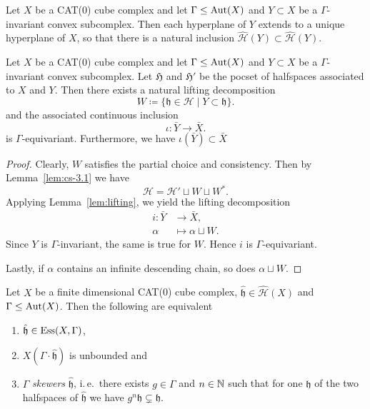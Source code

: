 \begin{lemma}
  \label{lem:cs-3.1}
  Let \(X\) be a CAT(0) cube complex and let \(\Gamma \leq \operatorname{Aut}(X)\) and \(Y \subset X\) be a \(\Gamma\)-invariant convex subcomplex. Then each hyperplane of \(Y\) extends to a unique hyperplane of \(X\), so that there is a natural inclusion \(\mathcal{\hat H}(Y) \subset \mathcal{\hat H}(Y)\).
\end{lemma}

\begin{lemma}
  \label{lem:roller-bnd-embedding}
  Let \(X\) be a CAT(0) cube complex and let \(\Gamma \leq \operatorname{Aut}(X)\) and \(Y \subset X\) be a \(\Gamma\)-invariant convex subcomplex. Let \(\mathfrak{H}\) and \(\mathfrak{H}'\) be the pocset of halfspaces associated to \(X\) and \(Y\). Then there exists a natural lifting decomposition
  \[
    W \coloneqq \{\mathfrak{h} \in \mathcal{H} \mid Y \subset \mathfrak{h}\}.
  \]
  and the associated continuous inclusion 
  \[
    \iota\colon \bar Y \to \bar X.
  \]
  is \(\Gamma\)-equivariant. Furthermore, we have \(\iota(\bar Y) \subset \bar X\)
\end{lemma}

\begin{proof}
  Clearly, \(W\) satisfies the partial choice and consistency. Then by Lemma~\ref{lem:cs-3.1} we have
  \[
    \mathcal{H} = \mathcal{H}' \sqcup W \sqcup W^\ast.
  \]
  Applying Lemma~\ref{lem:lifting}, we yield the lifting decomposition
  \begin{align*}
    i\colon \bar Y & \to \bar X,\\
    \alpha & \mapsto \alpha \sqcup W.
  \end{align*}
  Since \(Y\) is \(\Gamma\)-invariant, the same is true for \(W\). Hence \(i\) is \(\Gamma\)-equivariant.

  Lastly, if \(\alpha\) contains an infinite descending chain, so does \(\alpha \sqcup W\).
\end{proof}

\begin{lemma}
  \label{lem:ess-unbounded}
  Let \(X\) be a finite dimensional CAT(0) cube complex, \(\mathfrak{\hat h} \in \mathcal{\hat H}(X)\) and \(\Gamma \leq \operatorname{Aut}(X)\). Then the following are equivalent
  \begin{enumerate}
  \item \(\mathfrak{\hat h} \in \operatorname{Ess}(X,\Gamma)\),
  \item  \(X(\Gamma \cdot \mathfrak{\hat h})\) is unbounded and
  \item \(\Gamma\) \emph{skewers} \(\mathfrak{\hat h}\), i.\,e.\ there exists \(g \in \Gamma\) and \(n \in \mathbb{N}\) such that for one \(\mathfrak{h}\) of the two halfspaces of \(\mathfrak{\hat h}\) we have \(g^n \mathfrak{h} \subsetneq \mathfrak{h}\).
  \end{enumerate}
\end{lemma}

